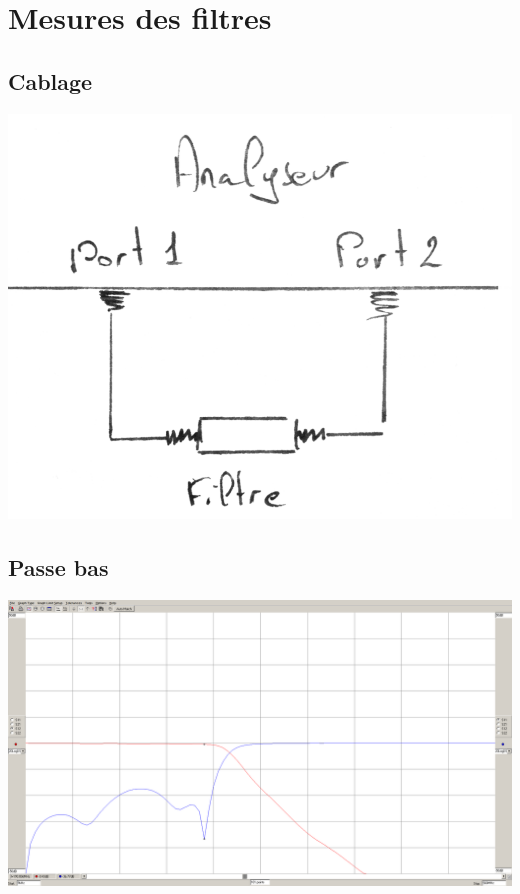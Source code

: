 \documentclass[a4paper,12pt]{report}            %
\begin{document}
\chapter{Mesures des filtres}

\section{Cablage}

\begin{center}\includegraphics[scale = 0.2]{pic/Cablage_filtre.png}\\ \end{center}

\section{Passe bas}

\begin{center}\includegraphics[scale = 0.25]{pic/parametre_passe_bas.png}\\ \end{center}
\end{document}
